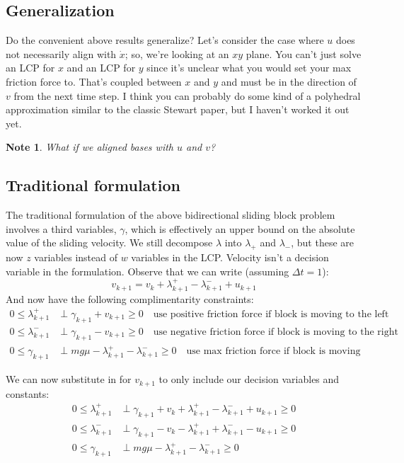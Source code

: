 \documentclass{article}
\newtheorem{note}{Note}
\begin{document}
\subsection{Generalization}
Do the convenient above results generalize? Let's consider the case where $u$ does not necessarily align with $\dot x$; so, we're looking at an $xy$ plane. You can't just solve an LCP for $x$ and an LCP for $y$ since it's unclear what you would set your max friction force to. That's coupled between $x$ and $y$ and must be in the direction of $v$ from the next time step. I think you can probably do some kind of a polyhedral approximation similar to the classic Stewart paper, but I haven't worked it out yet.

\begin{note}
    What if we aligned bases with $u$ and $v$?
\end{note}

\subsection{Traditional formulation}
The traditional formulation of the above bidirectional sliding block problem involves a third variables, $\gamma$, which is effectively an upper bound on the absolute value of the sliding velocity. We still decompose $\lambda$ into $\lambda_+$ and $\lambda_-$, but these are now $z$ variables instead of $w$ variables in the LCP. Velocity isn't a decision variable in the formulation. Observe that we can write (assuming $\Delta t = 1$):
\[
    v_{k+1} = v_k + \lambda^+_{k+1} - \lambda^-_{k+1} + u_{k+1}
\]
And now have the following complimentarity constraints:
\begin{align*}
    0 \leq \lambda^+_{k+1} &\perp \gamma_{k+1} + v_{k+1} \geq 0 \quad \textrm{use positive friction force if block is moving to the left}\\
    0 \leq \lambda^-_{k+1} &\perp \gamma_{k+1} - v_{k+1} \geq 0 \quad \textrm{use negative friction force if block is moving to the right}\\
    0 \leq \gamma_{k+1} &\perp m g \mu - \lambda^+_{k+1} - \lambda^-_{k+1} \geq 0 \quad \textrm{use max friction force if block is moving}
\end{align*}

We can now substitute in for $v_{k+1}$ to only include our decision variables and constants:
\begin{align*}
    0 \leq \lambda^+_{k+1} &\perp \gamma_{k+1} + v_k + \lambda^+_{k+1} - \lambda^-_{k+1} + u_{k+1} \geq 0 \\
    0 \leq \lambda^-_{k+1} &\perp \gamma_{k+1} - v_k - \lambda^+_{k+1} + \lambda^-_{k+1} - u_{k+1} \geq 0 \\
    0 \leq \gamma_{k+1} &\perp m g \mu - \lambda^+_{k+1} - \lambda^-_{k+1} \geq 0
\end{align*}
\end{document}
